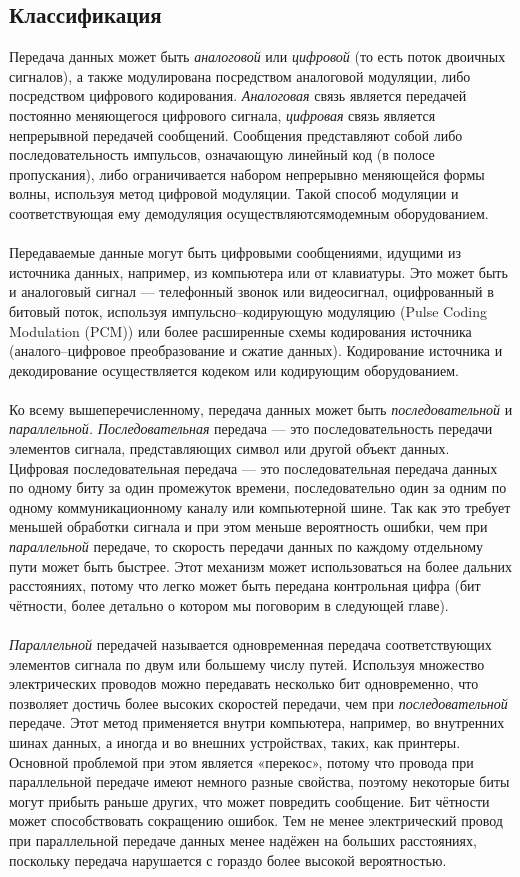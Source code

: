 \subsection{Классификация}
Передача данных может быть \emph{аналоговой} или \emph{цифровой} (то есть поток двоичных сигналов), а также модулирована посредством аналоговой модуляции, либо посредством цифрового кодирования. \emph{Аналоговая} связь является передачей постоянно меняющегося цифрового сигнала, \emph{цифровая} связь является непрерывной передачей сообщений. Сообщения представляют собой либо последовательность импульсов, означающую линейный код (в полосе пропускания), либо ограничивается набором непрерывно меняющейся формы волны, используя метод цифровой модуляции. Такой способ модуляции и соответствующая ему демодуляция осуществляютсямодемным оборудованием.\\
\\Передаваемые данные могут быть цифровыми сообщениями, идущими из источника данных, например, из компьютера или от клавиатуры. Это может быть и аналоговый сигнал — телефонный звонок или видеосигнал, оцифрованный в битовый поток, используя импульсно--кодирующую модуляцию (Pulse Coding Modulation (PCM)) или более расширенные схемы кодирования источника (аналого--цифровое преобразование и сжатие данных). Кодирование источника и декодирование осуществляется кодеком или кодирующим оборудованием.\\
\\ Ко всему вышеперечисленному, передача данных может быть \emph{последовательной} и \emph{параллельной.} \emph{Последовательная} передача — это последовательность передачи элементов сигнала, представляющих символ или другой объект данных. Цифровая последовательная передача — это последовательная передача данных по одному биту за один промежуток времени, последовательно один за одним по одному коммуникационному каналу или компьютерной шине. Так как это требует меньшей обработки сигнала и при этом меньше вероятность ошибки, чем при \emph{параллельной} передаче, то скорость передачи данных по каждому отдельному пути может быть быстрее. Этот механизм может использоваться на более дальних расстояниях, потому что легко может быть передана контрольная цифра (бит чётности, более детально о котором мы поговорим в следующей главе).\\
\\\emph{Параллельной} передачей называется одновременная передача соответствующих элементов сигнала по двум или большему числу путей. Используя множество электрических проводов можно передавать несколько бит одновременно, что позволяет достичь более высоких скоростей передачи, чем при \emph{последовательной} передаче. Этот метод применяется внутри компьютера, например, во внутренних шинах данных, а иногда и во внешних устройствах, таких, как принтеры. Основной проблемой при этом является «перекос», потому что провода при параллельной передаче имеют немного разные свойства, поэтому некоторые биты могут прибыть раньше других, что может повредить сообщение. Бит чётности может способствовать сокращению ошибок. Тем не менее электрический провод при параллельной передаче данных менее надёжен на больших расстояниях, поскольку передача нарушается с гораздо более высокой вероятностью.
